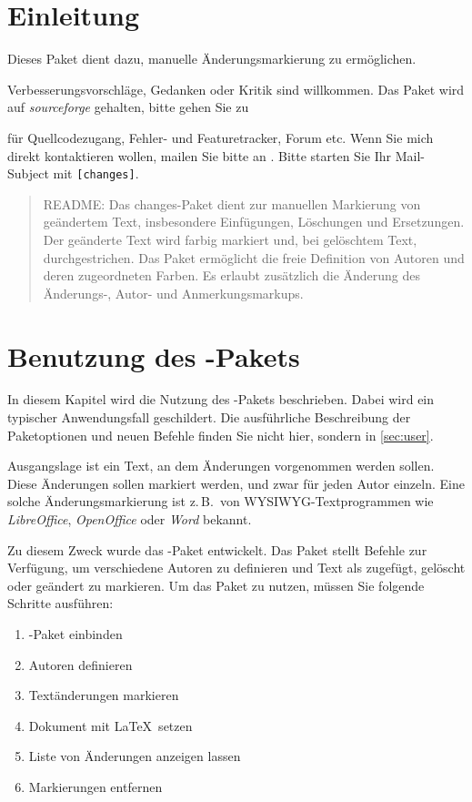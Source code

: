 \section{Einleitung}

Dieses Paket dient dazu, manuelle Änderungsmarkierung zu ermöglichen.

Verbesserungsvorschläge, Gedanken oder Kritik sind willkommen.
Das Paket wird auf \emph{sourceforge} gehalten, bitte gehen Sie zu



für Quellcodezugang, Fehler- und Featuretracker, Forum etc.
Wenn Sie mich direkt kontaktieren wollen, mailen Sie bitte an .
Bitte starten Sie Ihr Mail-Subject mit \texttt{[changes]}.

\begin{quote}
	\small\textsc{README:}
	Das changes-Paket dient zur manuellen Markierung von geändertem Text, insbesondere Einfügungen, Löschungen und Ersetzungen.
	Der geänderte Text wird farbig markiert und, bei gelöschtem Text, durchgestrichen.
	Das Paket ermöglicht die freie Definition von Autoren und deren zugeordneten Farben.
	Es erlaubt zusätzlich die Änderung des Änderungs-, Autor- und Anmerkungsmarkups.
\end{quote}


\section{Benutzung des -Pakets}
\label{sec:usage}

In diesem Kapitel wird die Nutzung des -Pakets beschrieben.
Dabei wird ein typischer Anwendungsfall geschildert.
Die ausführliche Beschreibung der Paketoptionen und neuen Befehle finden Sie nicht hier, sondern in \autoref{sec:user}.

Ausgangslage ist ein Text, an dem Änderungen vorgenommen werden sollen.
Diese Änderungen sollen markiert werden, und zwar für jeden Autor einzeln.
Eine solche Änderungsmarkierung ist z.\,B.\ von WYSIWYG-Textprogrammen wie \emph{LibreOffice}, \emph{OpenOffice} oder \emph{Word} bekannt.

Zu diesem Zweck wurde das -Paket entwickelt.
Das Paket stellt Befehle zur Verfügung, um verschiedene Autoren zu definieren und Text als zugefügt, gelöscht oder geändert zu markieren.
Um das Paket zu nutzen, müssen Sie folgende Schritte ausführen:
\begin{enumerate}
	\item {}-Paket einbinden
	\item Autoren definieren
	\item Textänderungen markieren
	\item Dokument mit \LaTeX\ setzen
	\item Liste von Änderungen anzeigen lassen
	\item Markierungen entfernen
\end{enumerate}

